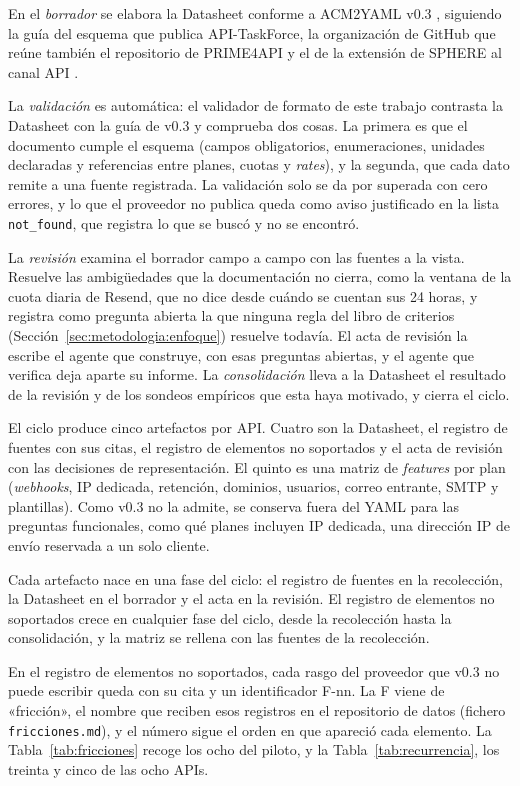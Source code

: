 En el \textit{borrador} se elabora la Datasheet conforme a ACM2YAML v0.3 \citep{gavira2026tfm}, siguiendo la guía del esquema que publica API-TaskForce, la organización de GitHub que reúne también el repositorio de PRIME4API y el de la extensión de SPHERE al canal API \citep{apisconsumptionmodel}.

La \textit{validación} es automática: el validador de formato de este trabajo contrasta la Datasheet con la guía de v0.3 y comprueba dos cosas.
La primera es que el documento cumple el esquema (campos obligatorios, enumeraciones, unidades declaradas y referencias entre planes, cuotas y \textit{rates}), y la segunda, que cada dato remite a una fuente registrada.
La validación solo se da por superada con cero errores, y lo que el proveedor no publica queda como aviso justificado en la lista \texttt{not\_found}, que registra lo que se buscó y no se encontró.

La \textit{revisión} examina el borrador campo a campo con las fuentes a la vista.
Resuelve las ambigüedades que la documentación no cierra, como la ventana de la cuota diaria de Resend, que no dice desde cuándo se cuentan sus 24 horas, y registra como pregunta abierta la que ninguna regla del libro de criterios (Sección~\ref{sec:metodologia:enfoque}) resuelve todavía.
El acta de revisión la escribe el agente que construye, con esas preguntas abiertas, y el agente que verifica deja aparte su informe.
La \textit{consolidación} lleva a la Datasheet el resultado de la revisión y de los sondeos empíricos que esta haya motivado, y cierra el ciclo.

El ciclo produce cinco artefactos por API.
Cuatro son la Datasheet, el registro de fuentes con sus citas, el registro de elementos no soportados y el acta de revisión con las decisiones de representación.
El quinto es una matriz de \textit{features} por plan (\textit{webhooks}, IP dedicada, retención, dominios, usuarios, correo entrante, SMTP y plantillas).
Como v0.3 no la admite, se conserva fuera del YAML para las preguntas funcionales, como qué planes incluyen IP dedicada, una dirección IP de envío reservada a un solo cliente.

Cada artefacto nace en una fase del ciclo: el registro de fuentes en la recolección, la Datasheet en el borrador y el acta en la revisión.
El registro de elementos no soportados crece en cualquier fase del ciclo, desde la recolección hasta la consolidación, y la matriz se rellena con las fuentes de la recolección.

En el registro de elementos no soportados, cada rasgo del proveedor que v0.3 no puede escribir queda con su cita y un identificador F-nn.
La F viene de «fricción», el nombre que reciben esos registros en el repositorio de datos (fichero \texttt{fricciones.md}), y el número sigue el orden en que apareció cada elemento.
La Tabla~\ref{tab:fricciones} recoge los ocho del piloto, y la Tabla~\ref{tab:recurrencia}, los treinta y cinco de las ocho APIs.

